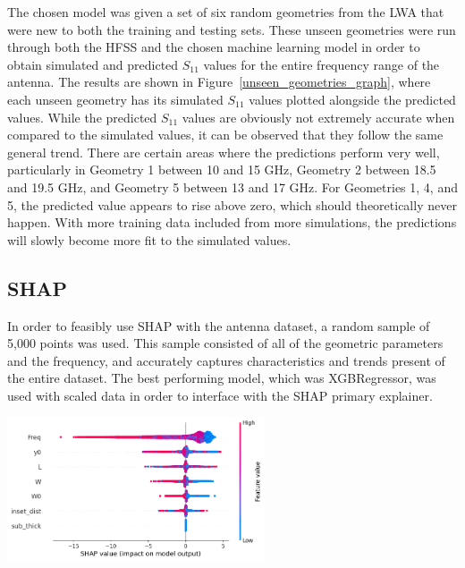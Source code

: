 \documentclass[conference]{IEEEtran}
\newenvironment{Figure}
    {\par\medskip\noindent\minipage{\linewidth}}
    {\endminipage\par\medskip}
\begin{document}
The chosen model was given a set of six random geometries from the LWA that were new to both the training and testing sets. These unseen geometries were run through both the HFSS and the chosen machine learning model in order to obtain simulated and predicted $S_{11}$ values for the entire frequency range of the antenna. The results are shown in Figure~\ref{unseen_geometries_graph}, where each unseen geometry has its simulated $S_{11}$ values plotted alongside the predicted values. While the predicted $S_{11}$ values are obviously not extremely accurate when compared to the simulated values, it can be observed that they follow the same general trend. There are certain areas where the predictions perform very well, particularly in Geometry 1 between 10 and 15 GHz, Geometry 2 between 18.5 and 19.5 GHz, and Geometry 5 between 13 and 17 GHz. For Geometries 1, 4, and 5, the predicted value appears to rise above zero, which should theoretically never happen. With more training data included from more simulations, the predictions will slowly become more fit to the simulated values. 


\subsection{SHAP}
In order to feasibly use SHAP with the antenna dataset, a random sample of 5,000 points was used. This sample consisted of all of the geometric parameters and the frequency, and accurately captures characteristics and trends present of the entire dataset. The best performing model, which was XGBRegressor, was used with scaled data in order to interface with the SHAP primary explainer. 

    
\begin{Figure}
\centering
\includegraphics[width=3in]{shap_beeswarm}
\label{shap_beeswarm}
\end{Figure}
\end{document}
